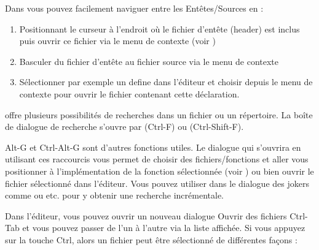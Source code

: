 
Dans \codeblocks vous pouvez facilement naviguer entre les Entêtes/Sources en :

\begin{enumerate}
\item Positionnant le curseur à l'endroit où le fichier d'entête (header) est inclus puis ouvrir ce fichier via le menu de contexte  (voir )
\item Basculer du fichier d'entête au fichier source via le menu de contexte 
\item Sélectionner par exemple un define dans l'éditeur et choisir  depuis le menu de contexte pour ouvrir le fichier contenant cette déclaration.
\end{enumerate}


\codeblocks offre plusieurs possibilités de recherches dans un fichier ou un répertoire. La boîte de dialogue de recherche s'ouvre par  (Ctrl-F) ou  (Ctrl-Shift-F).

Alt-G et Ctrl-Alt-G sont d'autres fonctions utiles. Le dialogue qui s'ouvrira en utilisant ces raccourcis vous permet de choisir des fichiers/fonctions et aller vous positionner à l'implémentation de la fonction sélectionnée (voir ) ou bien ouvrir le fichier sélectionné dans l'éditeur. Vous pouvez utiliser dans le dialogue des jokers comme \codeline{*} ou  etc. pour y obtenir une recherche incrémentale.



Dans l'éditeur, vous pouvez ouvrir un nouveau dialogue Ouvrir des fichiers Ctrl-Tab et vous pouvez passer de l'un à l'autre via la liste affichée. Si vous appuyez sur la touche Ctrl, alors un fichier peut être sélectionné de différentes façons :

